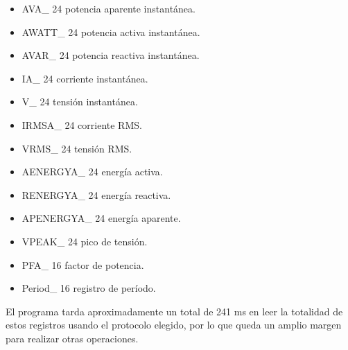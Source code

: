 \begin{itemize}
\item AVA\_ 24 potencia aparente instantánea. 
\item AWATT\_ 24 potencia activa instantánea.
\item AVAR\_ 24 potencia reactiva instantánea. 
\item IA\_ 24 corriente instantánea.
\item V\_ 24 tensión instantánea.
\item IRMSA\_ 24 corriente RMS.
\item VRMS\_ 24 tensión RMS.
\item AENERGYA\_ 24 energía activa.
\item RENERGYA\_ 24 energía reactiva.
\item APENERGYA\_ 24  energía aparente.
\item VPEAK\_ 24 pico de tensión.
\item PFA\_ 16 factor de potencia.
\item Period\_ 16 registro de período.
\end{itemize}


El programa tarda aproximadamente un total de 241 ms en leer la totalidad de estos registros usando el protocolo elegido, por lo que queda un amplio margen para realizar otras operaciones.








